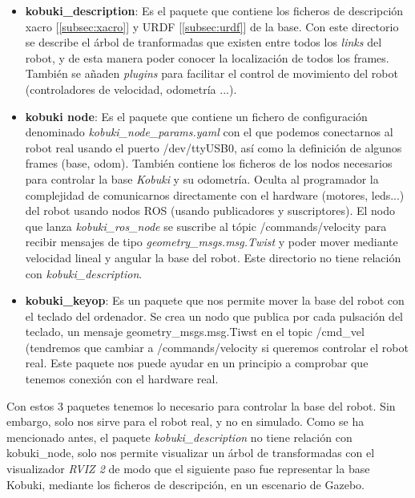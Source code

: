 \begin{itemize}
	\item \textbf{kobuki\_description}: Es el paquete que contiene los ficheros de descripción xacro [\ref{subsec:xacro}] y URDF [\ref{subsec:urdf}] de la base. Con este directorio se describe el árbol de tranformadas que existen entre todos los \textit{links} del robot, y de esta manera poder conocer la localización de todos los frames. También se añaden \textit{plugins} para facilitar el control de movimiento del robot (controladores de velocidad, odometría ...).
	\item \textbf{kobuki node}: Es el paquete que contiene un fichero de configuración denominado \textit{kobuki\_node\_params.yaml} con el que podemos conectarnos al robot real usando el puerto /dev/ttyUSB0, así como la definición de algunos frames (base, odom). También contiene los ficheros de los nodos necesarios para controlar la base \textit{Kobuki} y su odometría. Oculta al programador la complejidad de comunicarnos directamente con el hardware (motores, leds...) del robot usando nodos ROS (usando publicadores y suscriptores). El nodo que lanza \textit{kobuki\_ros\_node} se suscribe al tópic /commands/velocity para recibir mensajes de tipo \textit{geometry\_msgs.msg.Twist} y poder mover mediante velocidad lineal y angular la base del robot. Este directorio no tiene relación con \textit{kobuki\_description}.
	\item \textbf{kobuki\_keyop}: Es un paquete que nos permite mover la base del robot con el teclado del ordenador. Se crea un nodo que publica por cada pulsación del teclado, un mensaje geometry\_msgs.msg.Tiwst en el topic /cmd\_vel (tendremos que cambiar a /commands/velocity si queremos controlar el robot real. Este paquete nos puede ayudar en un principio a comprobar que tenemos conexión con el hardware real.
\end{itemize}

Con estos 3 paquetes tenemos lo necesario para controlar la base del robot. Sin embargo, solo nos sirve para el robot real, y no en simulado. Como se ha mencionado antes, el paquete \textit{kobuki\_description} no tiene relación con kobuki\_node, solo nos permite visualizar un árbol de transformadas con el visualizador \textit{RVIZ 2} de modo que el siguiente paso fue representar la base Kobuki, mediante los ficheros de descripción, en un escenario de Gazebo.\\




